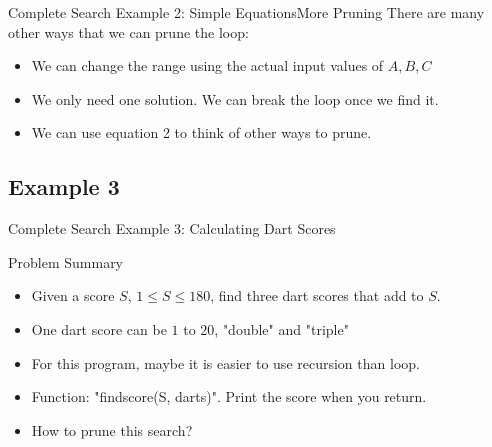 \begin{frame}{Complete Search Example 2: Simple Equations}{More Pruning}
  There are many other ways that we can prune the loop:

  \medskip

  \begin{itemize}
  \item We can change the range using the actual input values of $A,B,C$
  \item We only need one solution. We can break the loop once we find it.
  \item We can use equation 2 to think of other ways to prune.
  \end{itemize}

  \vfill

\end{frame}

\subsection{Example 3}
\begin{frame}{Complete Search Example 3: Calculating Dart Scores}
  \begin{block}{Problem Summary}
    \begin{itemize}
      \item Given a score $S$, $1\leq S \leq 180$, find three dart scores that add to $S$.
      \item One dart score can be $1$ to $20$, "double" and "triple"
    \end{itemize}
  \end{block}
  \vfill

  \begin{itemize}
    \item For this program, maybe it is easier to use recursion than loop.
    \item Function: "findscore(S, darts)". Print the score when you return.
    \item How to prune this search?
  \end{itemize}
\end{frame}
